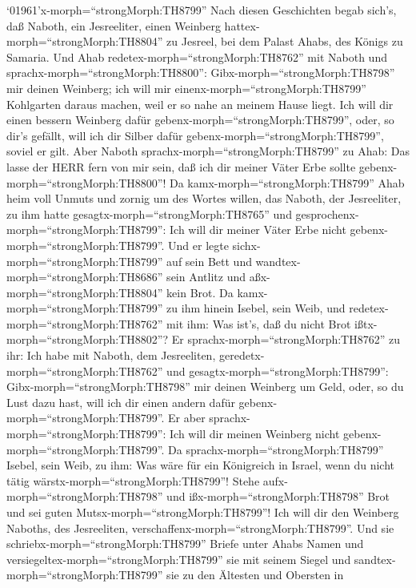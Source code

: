  `01961'\textbar x-morph=``strongMorph:TH8799'' Nach diesen
Geschichten begab sich's, daß Naboth, ein Jesreeliter, einen Weinberg
hattex-morph=``strongMorph:TH8804'' zu Jesreel, bei dem Palast Ahabs,
des Königs zu Samaria.  Und Ahab
redetex-morph=``strongMorph:TH8762'' mit Naboth und
sprachx-morph=``strongMorph:TH8800'': Gibx-morph=``strongMorph:TH8798''
mir deinen Weinberg; ich will mir einenx-morph=``strongMorph:TH8799''
Kohlgarten daraus machen, weil er so nahe an meinem Hause liegt. Ich
will dir einen bessern Weinberg dafür
gebenx-morph=``strongMorph:TH8799'', oder, so dir's gefällt, will ich
dir Silber dafür gebenx-morph=``strongMorph:TH8799'', soviel er gilt.
 Aber Naboth sprachx-morph=``strongMorph:TH8799'' zu Ahab:
Das lasse der HERR fern von mir sein, daß ich dir meiner Väter Erbe
sollte gebenx-morph=``strongMorph:TH8800''!  Da
kamx-morph=``strongMorph:TH8799'' Ahab heim voll Unmuts und zornig um
des Wortes willen, das Naboth, der Jesreeliter, zu ihm hatte
gesagtx-morph=``strongMorph:TH8765'' und
gesprochenx-morph=``strongMorph:TH8799'': Ich will dir meiner Väter Erbe
nicht gebenx-morph=``strongMorph:TH8799''. Und er legte
sichx-morph=``strongMorph:TH8799'' auf sein Bett und
wandtex-morph=``strongMorph:TH8686'' sein Antlitz und
aßx-morph=``strongMorph:TH8804'' kein Brot.  Da
kamx-morph=``strongMorph:TH8799'' zu ihm hinein Isebel, sein Weib, und
redetex-morph=``strongMorph:TH8762'' mit ihm: Was ist's, daß du nicht
Brot ißtx-morph=``strongMorph:TH8802''?  Er
sprachx-morph=``strongMorph:TH8762'' zu ihr: Ich habe mit Naboth, dem
Jesreeliten, geredetx-morph=``strongMorph:TH8762'' und
gesagtx-morph=``strongMorph:TH8799'': Gibx-morph=``strongMorph:TH8798''
mir deinen Weinberg um Geld, oder, so du Lust dazu hast, will ich dir
einen andern dafür gebenx-morph=``strongMorph:TH8799''. Er aber
sprachx-morph=``strongMorph:TH8799'': Ich will dir meinen Weinberg nicht
gebenx-morph=``strongMorph:TH8799''.  Da
sprachx-morph=``strongMorph:TH8799'' Isebel, sein Weib, zu ihm: Was wäre
für ein Königreich in Israel, wenn du nicht tätig
wärstx-morph=``strongMorph:TH8799''! Stehe
aufx-morph=``strongMorph:TH8798'' und ißx-morph=``strongMorph:TH8798''
Brot und sei guten Mutsx-morph=``strongMorph:TH8799''! Ich will dir den
Weinberg Naboths, des Jesreeliten,
verschaffenx-morph=``strongMorph:TH8799''.  Und sie
schriebx-morph=``strongMorph:TH8799'' Briefe unter Ahabs Namen und
versiegeltex-morph=``strongMorph:TH8799'' sie mit seinem Siegel und
sandtex-morph=``strongMorph:TH8799'' sie zu den Ältesten und Obersten in
